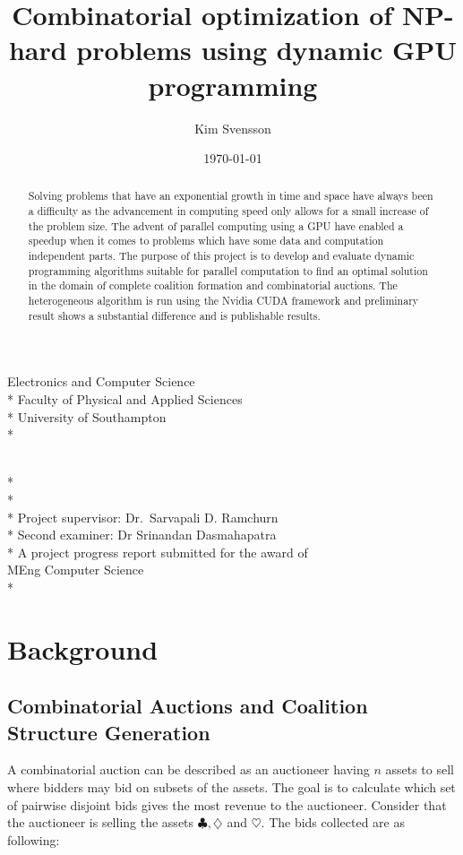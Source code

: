 \documentclass[a4paper, 12pt]{report}
\newcommand{\tdegree}{A project progress report submitted for the award of\\}
\newcommand{\degree}{\tdegree MEng Computer Science\\*}
\newcommand{\texam}{Second examiner: }
\newcommand{\exam}{\texam Dr Srinandan Dasmahapatra}
\newcommand{\tsupervisor}{Project supervisor: }
\newcommand{\supervisor}{\tsupervisor Dr.\ Sarvapali D. Ramchurn}
\newcommand{\school}{Electronics and Computer Science \\*
Faculty of Physical and Applied Sciences\\*
University of Southampton\\*}
\newenvironment{changemargin}[2]{%
\begin{list}{}{%
\setlength{\topsep}{0pt}%
\setlength{\leftmargin}{#1}%
\setlength{\rightmargin}{#2}%
\setlength{\listparindent}{\parindent}%
\setlength{\itemindent}{\parindent}%
\setlength{\parsep}{\parskip}%
}%
\item[]}{\end{list}}
\begin{document}
\author{Kim Svensson}
\date{\today}
\title{Combinatorial optimization of NP-hard problems using dynamic GPU programming}

\makeatletter
\begin{titlepage}
\begin{changemargin}{-2cm}{-2cm}
\begin{center}
\LARGE\school %

\LARGE
\vfill
\@author \\*
\@date \\*
\doublespacing
\@title \\*
\vfill
\singlespacing
\supervisor \\*
\exam \\*
\vfill
\degree
\end{center} 
\end{changemargin}
\end{titlepage}
\makeatother

\begin{abstract}
Solving problems that have an exponential growth in time and space have always been a difficulty as the advancement in computing speed only allows for a small increase of the problem size. The advent of parallel computing using a GPU have enabled a speedup when it comes to problems which have some data and computation independent parts.
The purpose of this project is to develop and evaluate dynamic programming algorithms suitable for parallel computation to find an optimal solution in the domain of complete coalition formation and combinatorial auctions. The heterogeneous algorithm is run using the Nvidia CUDA framework and preliminary result shows a substantial difference and is publishable results.

\end{abstract}
\tableofcontents
\newpage
\section{Background}
\subsection{Combinatorial Auctions and Coalition Structure Generation}
A combinatorial auction can be described as an auctioneer having $n$ assets to sell where bidders may bid on subsets of the assets. The goal is to calculate which set of pairwise disjoint bids gives the most revenue to the auctioneer. Consider that the auctioneer is selling the assets $\clubsuit , \diamondsuit$ and $\heartsuit$. The bids collected are as following:
\end{document}
